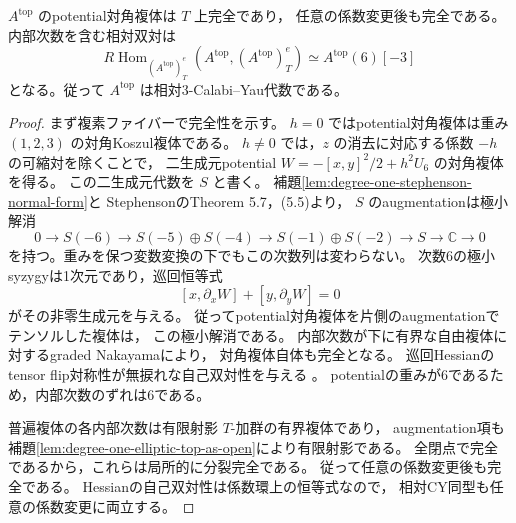 \begin{lemma}\label{lem:degree-one-elliptic-top-relative-cy}
$A^{\mathrm{top}}$ のpotential対角複体は $T$ 上完全であり，
任意の係数変更後も完全である。内部次数を含む相対双対は
\[
 R\!\operatorname{Hom}_{(A^{\mathrm{top}})^e_T}
       (A^{\mathrm{top}},(A^{\mathrm{top}})^e_T)
       \simeq A^{\mathrm{top}}(6)[-3]
\]
となる。従って $A^{\mathrm{top}}$ は相対3-Calabi--Yau代数である。
\end{lemma}
\begin{proof}
まず複素ファイバーで完全性を示す。
$h=0$ ではpotential対角複体は重み $(1,2,3)$ の対角Koszul複体である。
$h\ne0$ では，$z$ の消去に対応する係数 $-h$ の可縮対を除くことで，
二生成元potential $W=-[x,y]^2/2+h^2U_6$ の対角複体を得る。
この二生成元代数を $S$ と書く。
補題\ref{lem:degree-one-stephenson-normal-form}と
StephensonのTheorem 5.7，(5.5)\cite[pp.~2336--2338]{Stephenson1997}より，
$S$ のaugmentationは極小解消
\[
 0\longrightarrow S(-6)\longrightarrow S(-5)\oplus S(-4)
  \longrightarrow S(-1)\oplus S(-2)\longrightarrow S
  \longrightarrow\mathbb C\longrightarrow0
\]
を持つ。重みを保つ変数変換の下でもこの次数列は変わらない。
次数6の極小syzygyは1次元であり，巡回恒等式
\[
 [x,\partial_xW]+[y,\partial_yW]=0
\]
がその非零生成元を与える。
従ってpotential対角複体を片側のaugmentationでテンソルした複体は，
この極小解消である。
内部次数が下に有界な自由複体に対するgraded Nakayamaにより，
対角複体自体も完全となる。
巡回Hessianのtensor flip対称性が無捩れな自己双対性を与える
\cite[Proposition 5.1.9, Theorem 5.3.1, Proposition 8.1.3(ii)]{Ginzburg2007}。
potentialの重みが6であるため，内部次数のずれは6である。

普遍複体の各内部次数は有限射影 $T$-加群の有界複体であり，
augmentation項も補題\ref{lem:degree-one-elliptic-top-as-open}により有限射影である。
全閉点で完全であるから，これらは局所的に分裂完全である。
従って任意の係数変更後も完全である。
Hessianの自己双対性は係数環上の恒等式なので，
相対CY同型も任意の係数変更に両立する。
\end{proof}

